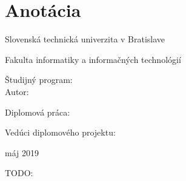 
\thispagestyle{empty}
\section*{Anotácia}

\begin{minipage}[t]{1\columnwidth}%
Slovenská technická univerzita v Bratislave

Fakulta informatiky a informačných technológií

Študijný program: \myStudyProgram\\

Autor: \myName

Diplomová práca: \myTitle

Vedúci diplomového projektu: \mySupervisor

máj 2019
\end{minipage}

\bigskip{}

TODO:

\newpage
\thispagestyle{empty}
\mbox{}
\newpage